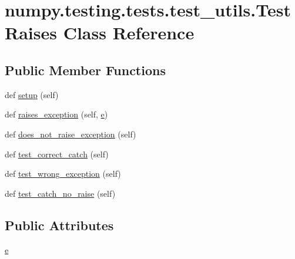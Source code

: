 \hypertarget{classnumpy_1_1testing_1_1tests_1_1test__utils_1_1TestRaises}{}\section{numpy.\+testing.\+tests.\+test\+\_\+utils.\+Test\+Raises Class Reference}
\label{classnumpy_1_1testing_1_1tests_1_1test__utils_1_1TestRaises}
\subsection*{Public Member Functions}
\begin{DoxyCompactItemize}
\item 
def \hyperlink{classnumpy_1_1testing_1_1tests_1_1test__utils_1_1TestRaises_a3fd41e595553de10ecda40cf95a912ac}{setup} (self)
\item 
def \hyperlink{classnumpy_1_1testing_1_1tests_1_1test__utils_1_1TestRaises_a8a760d1bb43f363fd38e01e3bfb55c31}{raises\+\_\+exception} (self, \hyperlink{classnumpy_1_1testing_1_1tests_1_1test__utils_1_1TestRaises_a124120008f8d59b345ece635dafa4e11}{e})
\item 
def \hyperlink{classnumpy_1_1testing_1_1tests_1_1test__utils_1_1TestRaises_a01e05ff20e203d51e5c344345572a474}{does\+\_\+not\+\_\+raise\+\_\+exception} (self)
\item 
def \hyperlink{classnumpy_1_1testing_1_1tests_1_1test__utils_1_1TestRaises_a3579f5669b30fdb2245c1765e7ae1ba6}{test\+\_\+correct\+\_\+catch} (self)
\item 
def \hyperlink{classnumpy_1_1testing_1_1tests_1_1test__utils_1_1TestRaises_ae185c1f77504c3bafcfa7a24729ed542}{test\+\_\+wrong\+\_\+exception} (self)
\item 
def \hyperlink{classnumpy_1_1testing_1_1tests_1_1test__utils_1_1TestRaises_a814e010e929bf04ef53c147dcb5e6eb0}{test\+\_\+catch\+\_\+no\+\_\+raise} (self)
\end{DoxyCompactItemize}
\subsection*{Public Attributes}
\begin{DoxyCompactItemize}
\item 
\hyperlink{classnumpy_1_1testing_1_1tests_1_1test__utils_1_1TestRaises_a124120008f8d59b345ece635dafa4e11}{e}
\end{DoxyCompactItemize}


